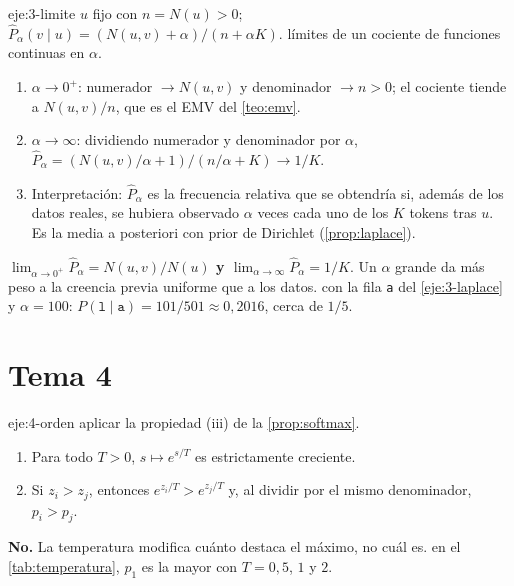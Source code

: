 \begin{solucion}{eje:3-limite}
\datos $u$ fijo con $n=N(u)>0$; $\widehat P_\alpha(v\mid u)=(N(u,v)+\alpha)/(n+\alpha K)$.
\planteamiento límites de un cociente de funciones continuas en $\alpha$.
\pasos
\begin{enumerate}[label=\arabic*.]
  \item $\alpha\to 0^{+}$: numerador $\to N(u,v)$ y denominador $\to n>0$; el cociente tiende a $N(u,v)/n$, que es el EMV del \cref{teo:emv}.
  \item $\alpha\to\infty$: dividiendo numerador y denominador por $\alpha$, $\widehat P_\alpha=(N(u,v)/\alpha+1)/(n/\alpha+K)\to 1/K$.
  \item Interpretación: $\widehat P_\alpha$ es la frecuencia relativa que se obtendría si, además de los datos reales, se hubiera observado $\alpha$ veces cada uno de los $K$ tokens tras $u$. Es la media a posteriori con prior de Dirichlet (\cref{prop:laplace}).
\end{enumerate}
\resultado \textbf{$\lim_{\alpha\to 0^+}\widehat P_\alpha=N(u,v)/N(u)$ y $\lim_{\alpha\to\infty}\widehat P_\alpha=1/K$}. Un $\alpha$ grande da más peso a la creencia previa uniforme que a los datos.
\comprobacion con la fila \texttt{a} del \cref{eje:3-laplace} y $\alpha=100$: $P(\texttt{l}\mid\texttt{a})=101/501\approx 0{,}2016$, cerca de $1/5$.
\end{solucion}

\section{Tema 4}

\begin{solucion}{eje:4-orden}
\planteamiento aplicar la propiedad (iii) de la \cref{prop:softmax}.
\pasos
\begin{enumerate}[label=\arabic*.]
  \item Para todo $T>0$, $s\mapsto e^{s/T}$ es estrictamente creciente.
  \item Si $z_i>z_j$, entonces $e^{z_i/T}>e^{z_j/T}$ y, al dividir por el mismo denominador, $p_i>p_j$.
\end{enumerate}
\resultado \textbf{No.} La temperatura modifica cuánto destaca el máximo, no cuál es.
\comprobacion en el \cref{tab:temperatura}, $p_1$ es la mayor con $T=0{,}5$, $1$ y $2$.
\end{solucion}

